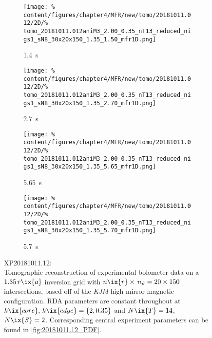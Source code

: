 %
            \begin{figure}[t]%
                \centering%
                \begin{subfigure}{0.48\textwidth}%
                    \centering%
                    \caption{\SI{1.4}{\second}}%
                    \texttt{[image: \%
                        content/figures/chapter4/MFR/new/tomo/20181011.012/2D/\%
                        tomo\_20181011.012aniM3\_2.00\_0.35\_nT13\_reduced\_nigs1\_sN8\_30x20x150\_1.35\_1.50\_mfr1D.png]}%
                    \end{subfigure}%
                \hfill%
                \begin{subfigure}{0.48\textwidth}%
                    \centering%
                    \caption{\SI{2.7}{\second}}%
                    \texttt{[image: \%
                        content/figures/chapter4/MFR/new/tomo/20181011.012/2D/\%
                        tomo\_20181011.012aniM3\_2.00\_0.35\_nT13\_reduced\_nigs1\_sN8\_30x20x150\_1.35\_2.70\_mfr1D.png]}%
                \end{subfigure}%
                \newline%
                \begin{subfigure}{0.48\textwidth}%
                    \centering%
                    \caption{\SI{5.65}{\second}}%
                    \texttt{[image: \%
                        content/figures/chapter4/MFR/new/tomo/20181011.012/2D/\%
                        tomo\_20181011.012aniM3\_2.00\_0.35\_nT13\_reduced\_nigs1\_sN8\_30x20x150\_1.35\_5.65\_mfr1D.png]}%
                \end{subfigure}%
                \hfill%
                \begin{subfigure}{0.48\textwidth}%
                    \centering%
                    \caption{\SI{5.7}{\second}}%
                    \texttt{[image: \%
                        content/figures/chapter4/MFR/new/tomo/20181011.012/2D/\%
                        tomo\_20181011.012aniM3\_2.00\_0.35\_nT13\_reduced\_nigs1\_sN8\_30x20x150\_1.35\_5.70\_mfr1D.png]}%
                \end{subfigure}%
                \caption{
                    XP20181011.12:\\%
                    Tomographic reconstruction of experimental bolometer data on a $1.35\,r\ix{a}$ inversion grid with $n\ix{r}\times\,n_{\vartheta}=20\times150$ intersections, based off of the \textit{KJM} high mirror magnetic configuration. RDA parameters are constant throughout at $k\ix{core},\,k\ix{edge}=\left\{2, 0.35\right\}$ and $N\ix{T}=14$, $N\ix{S}=2$. Corresponding central experiment parameters can be found in \cref{fig:20181011.12_PDF}.}\label{fig:tomo_20181011.12_times}%
            \end{figure}%
